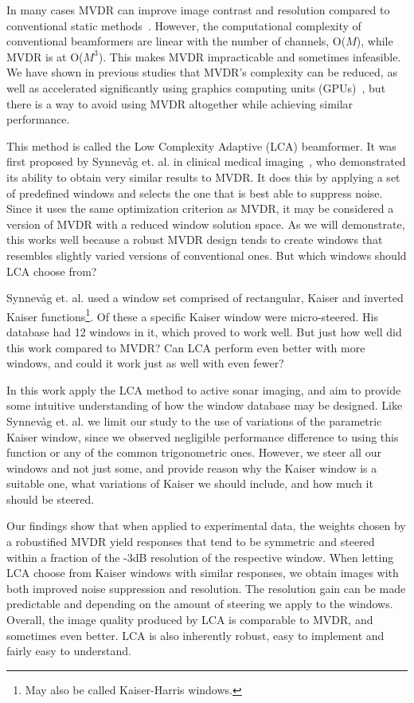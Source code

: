 \documentclass[10pt,journal,draftclsnofoot,onecolumn]{IEEEtran}
\newcommand\1{\vec 1}
\begin{document}
In many cases MVDR can improve image contrast and resolution compared to conventional static methods~\cite{Blomberg2013,Blomberg2012a,Dursun2009,Lo2004}. However, the computational complexity of conventional beamformers are linear with the number of channels, O($M$), while MVDR is at O($M^3$). This makes MVDR impracticable and sometimes infeasible. We have shown in previous studies that MVDR's complexity can be reduced, as well as accelerated significantly using graphics computing units (GPUs)~\cite{Buskenes2014,Asen2013}, but there is a way to avoid using MVDR altogether while achieving similar performance.

This method is called the Low Complexity Adaptive (LCA) beamformer. It was first proposed by Synnev\aa{}g et. al. in clinical medical imaging~\cite{Synnevag2008}, who demonstrated its ability to obtain very similar results to MVDR. It does this by applying a set of predefined windows and selects the one that is best able to suppress noise. Since it uses the same optimization criterion as MVDR, it may be considered a version of MVDR with a reduced window solution space. As we will demonstrate, this works well because a robust MVDR design tends to create windows that resembles slightly varied versions of conventional ones. But which windows should LCA choose from?

Synnev\aa{}g et. al. used a window set comprised of rectangular, Kaiser and inverted Kaiser functions\footnote{May also be called Kaiser-Harris windows.}. Of these a specific Kaiser window were micro-steered. His database had 12 windows in it, which proved to work well. But just how well did this work compared to MVDR? Can LCA perform even better with more windows, and could it work just as well with even fewer? 

In this work apply the LCA method to active sonar imaging, and aim to provide some intuitive understanding of how the window database may be designed. Like Synnev\aa{}g et. al. we limit our study to the use of variations of the parametric Kaiser window, since we observed negligible performance difference to using this function or any of the common trigonometric ones. However, we steer all our windows and not just some, and provide reason why the Kaiser window is a suitable one, what variations of Kaiser we should include, and how much it should be steered. 

Our findings show that when applied to experimental data, the weights chosen by a robustified MVDR yield responses that tend to be symmetric and steered within a fraction of the -3dB resolution of the respective window. When letting LCA choose from Kaiser windows with similar responses, we obtain images with both improved noise suppression and resolution. The resolution gain can be made predictable and depending on the amount of steering we apply to the windows. Overall, the image quality produced by LCA is comparable to MVDR, and sometimes even better. LCA is also inherently robust, easy to implement and fairly easy to understand.
\end{document}

